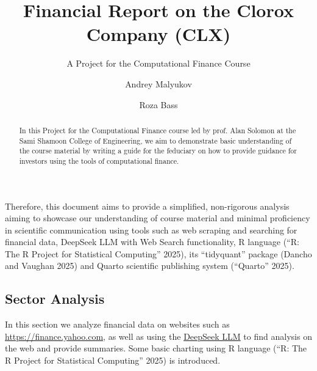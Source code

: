 \documentclass[
  letterpaper,
  DIV=11,
  numbers=noendperiod]{scrartcl}
\title{Financial Report on the Clorox Company (CLX)}
\subtitle{A Project for the Computational Finance Course}
\author{Andrey Malyukov \and Roza Bass}
\date{}
\renewcommand*\contentsname{Table of contents}
\newcommand\contentsname{Table of contents}
\begin{document}
\maketitle
\begin{abstract}
In this Project for the Computational Finance course led by prof. Alan
Solomon at the Sami Shamoon College of Engineering, we aim to
demonstrate basic understanding of the course material by writing a
guide for the feduciary on how to provide guidance for investors using
the tools of computational finance.
\end{abstract}

\renewcommand*\contentsname{Table of contents}
{
\hypersetup{linkcolor=}
\setcounter{tocdepth}{3}
\tableofcontents
}

\begin{tcolorbox}[enhanced jigsaw, colback=white, titlerule=0mm, coltitle=black, colbacktitle=quarto-callout-warning-color!10!white, bottomrule=.15mm, toprule=.15mm, left=2mm, rightrule=.15mm, breakable, opacityback=0, bottomtitle=1mm, colframe=quarto-callout-warning-color-frame, leftrule=.75mm, title=\textcolor{quarto-callout-warning-color}{\faExclamationTriangle}\hspace{0.5em}{On the simplified nature of analysis in this document.}, arc=.35mm, opacitybacktitle=0.6, toptitle=1mm]

Therefore, this document aims to provide a simplified, non-rigorous
analysis aiming to showcase our understanding of course material and
minimal proficiency in scientific communication using tools such as web
scraping and searching for financial data, DeepSeek LLM with Web Search
functionality, R language ({``R: {The R Project} for {Statistical
Computing}''} 2025), its ``tidyquant'' package (Dancho and Vaughan 2025)
and Quarto scientific publishing system ({``Quarto''} 2025).

\end{tcolorbox}

\subsection{Sector Analysis}\label{sector-analysis}

\begin{tcolorbox}[enhanced jigsaw, colback=white, titlerule=0mm, coltitle=black, colbacktitle=quarto-callout-note-color!10!white, bottomrule=.15mm, toprule=.15mm, left=2mm, rightrule=.15mm, breakable, opacityback=0, bottomtitle=1mm, colframe=quarto-callout-note-color-frame, leftrule=.75mm, title=\textcolor{quarto-callout-note-color}{\faInfo}\hspace{0.5em}{Note}, arc=.35mm, opacitybacktitle=0.6, toptitle=1mm]

In this section we analyze financial data on websites such as
\url{https://finance.yahoo.com}, as well as using the
\href{https://chat.deepseek.com/}{DeepSeek LLM} to find analysis on the
web and provide summaries. Some basic charting using R language ({``R:
{The R Project} for {Statistical Computing}''} 2025) is introduced.

\end{tcolorbox}
\end{document}
